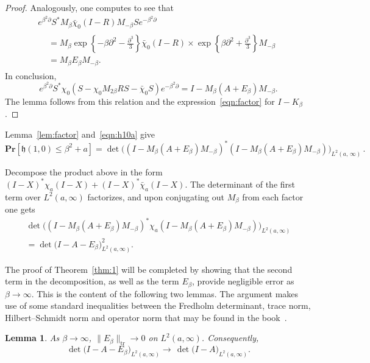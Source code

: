 \documentclass[10pt]{amsart}
\newtheorem{lemm}[theo]{Lemma}\newtheorem{prop}[theo]{Proposition}\newtheorem{coro}[theo]{Corollary}\newtheorem{conj}[theo]{Conjecture}
\theoremstyle{definition}\newtheorem{defi}[theo]{Definition}\newtheorem{rema}[theo]{Remark}\newtheorem{exam}[theo]{Example}\newtheorem{exem}[theo]{Example}\newtheorem{nota}[theo]{Notation}
\DeclareMathOperator{\tr}{tr}
\newcommand{\pr}[1]{\mathbf{Pr}\left[#1\right]}
\newcommand{\h}{\mathfrak{h}}
\begin{document}
\begin{proof}
Analogously, one computes to see that
\begin{multline*}
e^{\beta^2 \partial} S^{*}M_{\beta}\bar{\chi}_0(I - R)M_{-\beta}S e^{-\beta^2 \partial} \\
\begin{aligned}
& = M_{\beta} \exp \left \{ -\beta \partial^2 - \frac{\partial^3}{3} \right \} \bar{\chi}_0 (I-R)
\times \exp \left \{ \beta \partial^2 + \frac{\partial^3}{3} \right \} M_{-\beta} \\
& = M_{\beta} E_{\beta} M_{-\beta}.
\end{aligned}
\end{multline*}
In conclusion,
\[
e^{\beta^2 \partial} S^{*}\chi_0(S- \chi_0 M_{2\beta}RS - \bar{\chi}_0 S) e^{-\beta^2 \partial} =
I - M_{\beta} (A + E_{\beta}) M_{-\beta}.
\]
The lemma follows from this relation and the expression~\eqref{eqn:factor} for $I- K_{\beta}$.
\end{proof}

Lemma~\ref{lem:factor} and~\eqref{eqn:h10a} give
\[
\pr{\h(1,0) \leq \beta^2 + a} = \det \Big((I - M_{\beta}(A+ E_{\beta})M_{-\beta})^{*}
(I - M_{\beta}(A+ E_{\beta})M_{-\beta})\Big)_{L^2(a,\, \infty)}\,.
\]
\goodbreak

Decompose the product above in the form $(I-X)^{*} \chi_a (I-X) + (I-X)^{*} \bar{\chi}_a (I-X)$. The determinant of the first term over $L^2(a, \infty)$ factorizes, and upon conjugating out $M_{\beta}$ from each factor one gets
\begin{multline}\label{eqn:h10b}
\det \Big ((I - M_{\beta}(A+ E_{\beta})M_{-\beta})^{*} \chi_a (I - M_{\beta}(A+ E_{\beta})M_{-\beta}) \Big)_{L^2(a,\infty)}\\
=\det \Big (I - A- E_{\beta}\Big)_{L^2(a,\infty)}^2.
\end{multline}

The proof of Theorem~\ref{thm:1} will be completed by showing that the second term in the decomposition, as well as the term $E_{\beta}$, provide negligible error as $\beta \to \infty$. This is the content of the following two lemmas. The argument makes use of some standard inequalities between the Fredholm determinant, trace norm, Hilbert--Schmidt norm and operator norm that may be found in the book~\cite{Simon}.

\begin{lemm} \label{lem:error1}
As $\beta \to \infty$, $\| E_{\beta}\|_{\tr} \to 0$ on $L^2(a,\infty)$. Consequently,
\[
\det \big (I - A- E_{\beta}\big)_{L^2(a,\infty)} \longrightarrow \, \det \big (I - A \big)_{L^2(a,\infty)}.
\]
\end{lemm}
\end{document}
